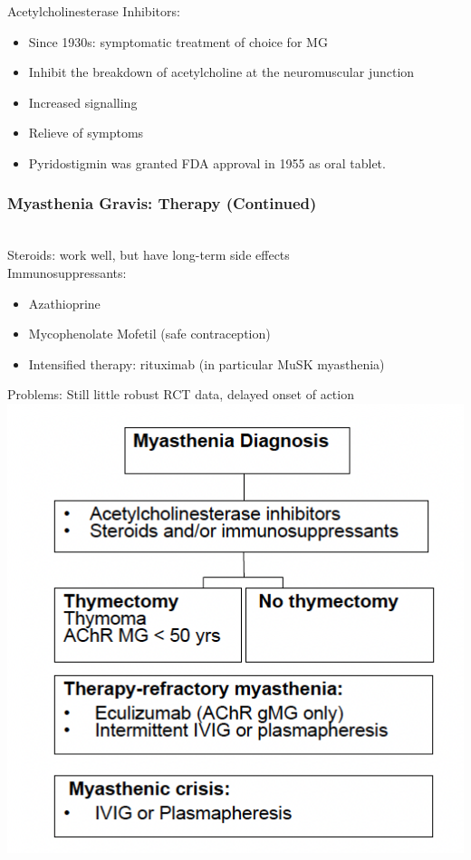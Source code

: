 \begin{itemize}
\begin{itemize}
Acetylcholinesterase Inhibitors:
\begin{itemize}
    \item Since 1930s: symptomatic
treatment of choice for MG
\item Inhibit the breakdown of
acetylcholine at the
neuromuscular junction
\item Increased signalling
\item Relieve of symptoms
\item Pyridostigmin was granted FDA
approval in 1955 as oral tablet.
\end{itemize}

\subsubsection{Myasthenia Gravis: Therapy (Continued)}
\\Steroids: work well, but have long-term side
effects
\\Immunosuppressants:
\begin{itemize}
    \item Azathioprine
\item Mycophenolate Mofetil (safe contraception)
\item Intensified therapy: rituximab (in particular
MuSK myasthenia)
\end{itemize}

Problems: Still little robust RCT data, delayed onset of action
\\
\includegraphics[width=1\textwidth]{Images/MGD.png}\\[1cm]




\end{itemize}
\end{itemize}
